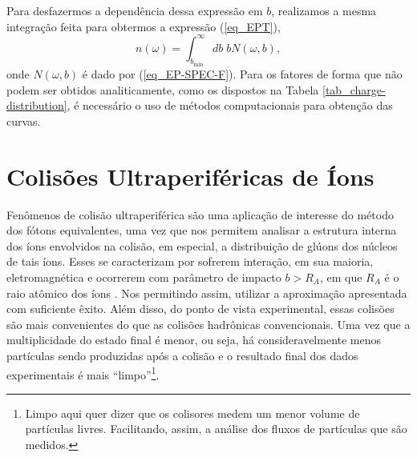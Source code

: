 \begin{table}[h]
\end{table}

Para desfazermos a dependência dessa expressão em $b$, realizamos a mesma
integração feita para obtermos a expressão (\ref{eq_EPT}),
\begin{equation}
	n(\omega) = \int _{b_\text{min}} ^\infty db \; b N(\omega,b),
\end{equation}
onde $N(\omega,b)$ é dado por (\ref{eq_EP-SPEC-F}). Para os fatores de forma
que não podem ser obtidos analiticamente, como os dispostos na Tabela
\ref{tab_charge-distribution}, é necessário o uso de métodos computacionais para
obtenção das curvas.

\section{Colisões Ultraperiféricas de Íons}
Fenômenos de colisão ultraperiférica são uma aplicação de interesse do
método dos fótons equivalentes, uma vez que nos permitem analisar a estrutura
interna dos íons envolvidos na colisão, em especial, a distribuição de glúons
dos núcleos de tais íons. Esses se caracterizam por sofrerem interação, em sua
maioria, eletromagnética e ocorrerem com parâmetro de impacto $b >  R_A$, em
que $R_A$ é o raio atômico dos íons \cite{bertulani2005}. Nos permitindo assim,
utilizar a aproximação apresentada com suficiente êxito. Além disso, do ponto
de vista experimental, essas colisões são mais convenientes do que as colisões
hadrônicas convencionais. Uma vez que a multiplicidade do estado final é menor,
ou seja, há consideravelmente menos partículas sendo produzidas após a colisão
e o resultado final dos dados experimentais é mais ``limpo''\footnote{Limpo aqui
quer dizer que os colisores medem um menor volume de partículas livres. Facilitando,
assim, a análise dos fluxos de partículas que são medidos.}.


